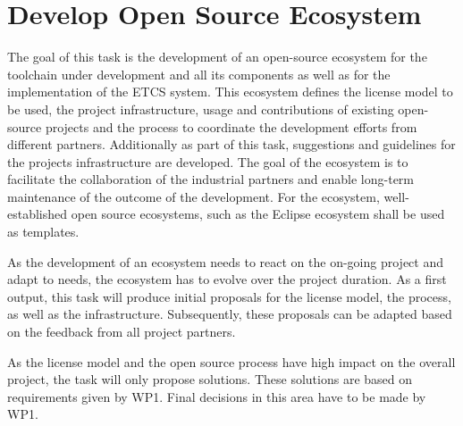 \documentclass{template/openetcs_article}
\begin{document}
\section{Develop Open Source Ecosystem}
The goal of this task is the development of an open-source ecosystem for the toolchain under development and all its components as well as for the implementation of the ETCS system. This ecosystem defines the license model to be used, the project infrastructure, usage and contributions of existing open-source projects and the process to coordinate the development efforts from different partners. Additionally as part of this task, suggestions and guidelines for the projects infrastructure are developed. The goal of the ecosystem is to facilitate the collaboration of the industrial partners and enable long-term maintenance of the outcome of the development. For the ecosystem, well-established open source ecosystems, such as the Eclipse ecosystem shall be used as templates.

As the development of an ecosystem needs to react on the on-going project and adapt to needs, the ecosystem has to evolve over the project duration. As a first output, this task will produce initial proposals for the license model, the process, as well as the infrastructure. Subsequently, these proposals can be adapted based on the feedback from all project partners.

As the license model and the open source process have high impact on the overall project, the task will only propose solutions. These solutions are based on requirements given by WP1. Final decisions in this area have to be made by WP1. 
\end{document}
